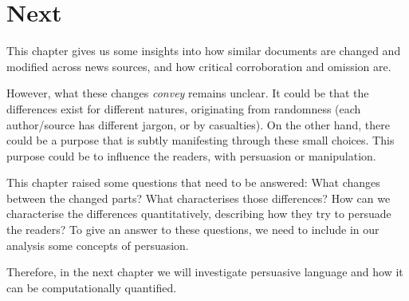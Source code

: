 \section{\statusgreen Next}
\label{sec:cgs_next}

This chapter gives us some insights into how similar documents are changed and modified across news sources, and how critical corroboration and omission are.



However, what these changes \emph{convey} remains unclear.
It could be that the differences exist for different natures, originating from randomness (each author/source has different jargon, or by casualties).
On the other hand, there could be a purpose that is subtly manifesting through these small choices. This purpose could be to influence the readers, with persuasion or manipulation.

This chapter raised some questions that need to be answered:
What changes between the changed parts? What characterises those differences? How can we characterise the differences quantitatively, describing how they try to persuade the readers? To give an answer to these questions, we need to include in our analysis some concepts of persuasion.

Therefore, in the next chapter we will investigate persuasive language and how it can be computationally quantified. 
